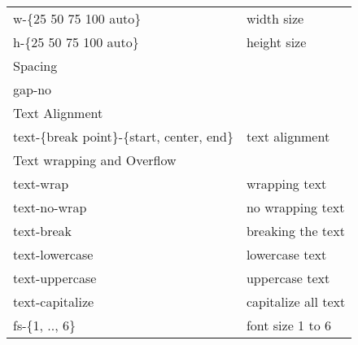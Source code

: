 \documentclass{article}
\begin{document}
\begin{longtable}{ll}
			w-\{25 50 75 100 auto\}                     & width size                                  \\
			h-\{25 50 75 100 auto\}                     & height size                                 \\ \hline
			Spacing                                     &                                             \\ \hline
			gap-no                                      &                                             \\ \hline
			Text Alignment                              &                                             \\ \hline
			text-\{break point\}-\{start, center, end\} & text alignment                              \\ \hline
			Text wrapping and Overflow                  &                                             \\ \hline
			text-wrap                                   & wrapping text                               \\
			text-no-wrap                                & no wrapping text                            \\ 
			text-break & breaking the text \\
			text-lowercase & lowercase text \\
			text-uppercase & uppercase text \\
			text-capitalize & capitalize all text \\
			fs-\{1, .., 6\} & font size 1 to 6 \\
						
		\end{longtable} 
	
\end{document}
